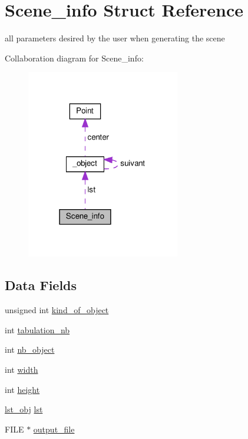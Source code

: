 \hypertarget{struct_scene__info}{}\section{Scene\+\_\+info Struct Reference}
\label{struct_scene__info}


all parameters desired by the user when generating the scene  




Collaboration diagram for Scene\+\_\+info\+:\nopagebreak
\begin{figure}[H]
\begin{center}
\leavevmode
\includegraphics[width=190pt]{struct_scene__info__coll__graph}
\end{center}
\end{figure}
\subsection*{Data Fields}
\begin{DoxyCompactItemize}
\item 
unsigned int \hyperlink{struct_scene__info_a424ae246251dbf194cf480fd3b3eba60}{kind\+\_\+of\+\_\+object}
\item 
int \hyperlink{struct_scene__info_a432ce34b9fc8367bdfca15bee393de96}{tabulation\+\_\+nb}
\item 
int \hyperlink{struct_scene__info_a5a69c7addc967ed8dbc9da830e1ab534}{nb\+\_\+object}
\item 
int \hyperlink{struct_scene__info_a2474a5474cbff19523a51eb1de01cda4}{width}
\item 
int \hyperlink{struct_scene__info_ad12fc34ce789bce6c8a05d8a17138534}{height}
\item 
\hyperlink{structlst__obj}{lst\+\_\+obj} \hyperlink{struct_scene__info_ab9f02bcf7c8c98ddd57f47e4d8035ac6}{lst}
\item 
F\+I\+LE $\ast$ \hyperlink{struct_scene__info_a2960eb597f48f3b59bbb850b47e895ff}{output\+\_\+file}
\end{DoxyCompactItemize}


